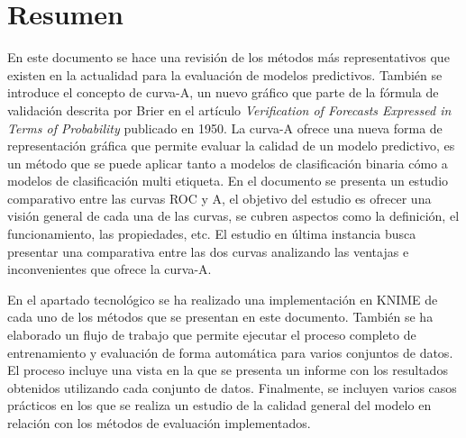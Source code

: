\thispagestyle{empty}
\section*{Resumen}

En este documento se hace una revisión de los métodos más representativos que existen en la actualidad para la evaluación de modelos predictivos.
También se introduce el concepto de curva-A, un nuevo gráfico que parte de la fórmula de validación descrita por Brier en el artículo \textit{Verification of Forecasts Expressed in Terms of Probability} \cite{brie_1950} publicado en 1950. La curva-A ofrece una nueva forma de representación gráfica que permite evaluar la calidad de un modelo predictivo, es un método que se puede aplicar tanto a modelos de clasificación binaria cómo a modelos de clasificación multi etiqueta. En el documento se presenta un estudio comparativo entre las curvas ROC y A, el objetivo del estudio es ofrecer una visión general de cada una de las curvas, se cubren aspectos como la definición, el funcionamiento, las propiedades, etc. El estudio en última instancia busca presentar una comparativa entre las dos curvas analizando las ventajas e inconvenientes que ofrece la curva-A.

\bigbreak

En el apartado tecnológico se ha realizado una implementación en KNIME de cada uno de los métodos que se presentan en este documento. También se ha elaborado un flujo de trabajo que permite ejecutar el proceso completo de entrenamiento y evaluación de forma automática para varios conjuntos de datos. El proceso incluye una vista en la que se presenta un informe con los resultados obtenidos utilizando cada conjunto de datos. Finalmente, se incluyen varios casos prácticos en los que se realiza un estudio de la calidad general del modelo en relación con los métodos de evaluación implementados.


\clearpage